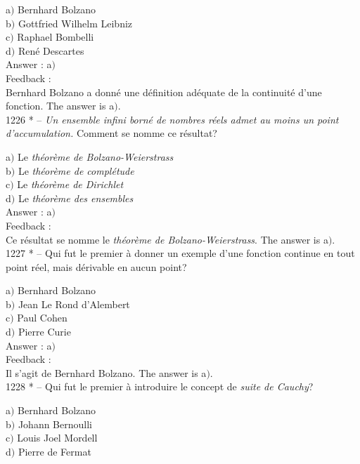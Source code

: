 \documentclass[letterpaper, 12pt]{article}
\begin{document}
a$)$ Bernhard Bolzano \\
b$)$ Gottfried Wilhelm Leibniz \\
c$)$ Raphael Bombelli \\
d$)$ Ren\'e Descartes\\

Answer : a$)$\\

Feedback : \\
Bernhard Bolzano a donn\'e une d\'efinition ad\'equate de la
continuit\'e d'une fonction.
The answer is a$)$.\\

1226 * -- {\sl Un ensemble infini born\'e de nombres r\'eels admet
au moins un point d'accumulation.} Comment se nomme ce r\'esultat?

a$)$ Le {\sl th\'eor\`eme de Bolzano-Weierstrass} \\
b$)$ Le {\sl th\'eor\`eme de compl\'etude} \\
c$)$ Le {\sl th\'eor\`eme de Dirichlet} \\
d$)$ Le {\sl th\'eor\`eme des ensembles}\\

Answer : a$)$\\

Feedback : \\
Ce r\'esultat se nomme le {\sl th\'eor\`eme de Bolzano-Weierstrass}.
The answer is a$)$.\\

1227 * -- Qui fut le premier \`a donner un exemple d'une fonction
continue en tout point r\'eel, mais d\'erivable en aucun point?

a$)$ Bernhard Bolzano \\
b$)$ Jean Le Rond d'Alembert \\
c$)$ Paul Cohen \\
d$)$ Pierre Curie\\

Answer : a$)$\\

Feedback : \\
Il s'agit de Bernhard Bolzano.
The answer is a$)$.\\

1228 * -- Qui fut le premier \`a introduire le concept de {\sl suite
de Cauchy}?

a$)$ Bernhard Bolzano \\
b$)$ Johann Bernoulli \\
c$)$ Louis Joel Mordell \\
d$)$ Pierre de Fermat\\
\end{document}
